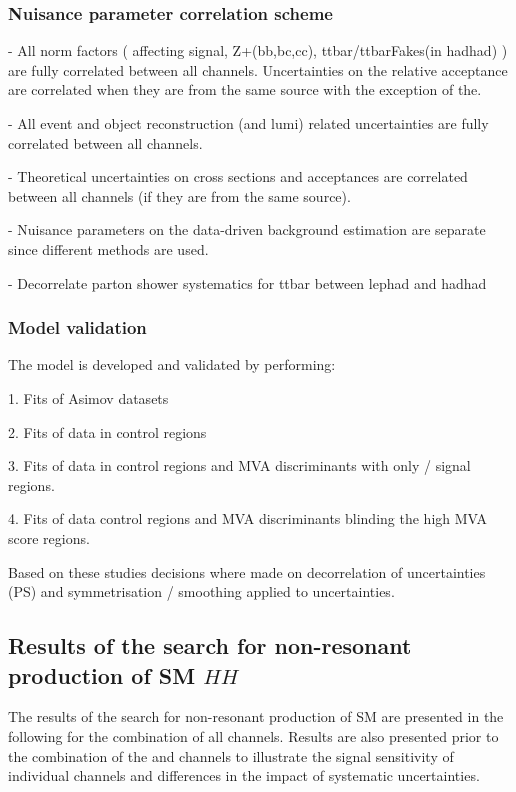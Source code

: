 \subsubsection{Nuisance parameter correlation scheme}

- All norm factors ( affecting signal, Z+(bb,bc,cc),
ttbar/ttbarFakes(in hadhad) ) are fully correlated between all
channels. Uncertainties on the relative acceptance are correlated when
they are from the same source with the exception of the.

- All event and object reconstruction (and lumi) related uncertainties
are fully correlated between all channels.

- Theoretical uncertainties on cross sections and acceptances are
correlated between all channels (if they are from the same source).

- Nuisance parameters on the data-driven background estimation are
separate since different methods are used.

- Decorrelate parton shower systematics for ttbar between lephad and
hadhad


\subsubsection{Model validation}

The model is developed and validated by performing:

1. Fits of Asimov datasets

2. Fits of data in control regions

3. Fits of data in control regions and MVA discriminants with only
\hadhad / \lephad signal regions.

4. Fits of data control regions and MVA discriminants blinding the
high MVA score regions.

Based on these studies decisions where made on decorrelation of
uncertainties (PS) and symmetrisation / smoothing applied to
uncertainties.


\subsection{Results of the search for non-resonant production of SM $HH$}
\label{sec:results_nonres}

The results of the search for non-resonant production of SM \HH are
presented in the following for the combination of all
channels. Results are also presented prior to the combination of the
\hadhad and \lephad channels to illustrate the signal sensitivity of
individual channels and differences in the impact of systematic
uncertainties.


